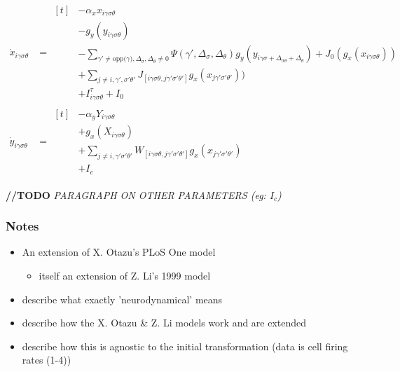 \documentclass[journal,onecolumn]{IEEEtran}
\begin{document}
\begin{align}
    \dot{x}_{i\gamma\sigma\theta} &= \begin{aligned}[t]
        & - \alpha_{x}x_{i\gamma\sigma\theta} \\
        & - g_y(y_{i\gamma\sigma\theta}) \\
        & - \sum\nolimits_{\gamma' \neq \text{opp($\gamma$)},\Delta_{\sigma},\Delta_{\theta} \neq 0}
            \Psi(\gamma',\Delta_{\sigma},\Delta_{\theta})
            g_y(y_{i\gamma\sigma + \Delta_{\sigma\theta} + \Delta_{\theta}})
            + J_0(g_x(x_{i\gamma\sigma\theta})) \\
        & + \sum\nolimits_{j \neq i,\gamma',\sigma'\theta'}
            J_{[i\gamma\sigma\theta, j\gamma'\sigma'\theta']}g_x(x_{j\gamma'\sigma'\theta'})) \\
        & + I^\tau_{i\gamma\sigma\theta} + I_0
        \end{aligned} \\
    \dot{y}_{i\gamma\sigma\theta} &= \begin{aligned}[t]
        & - \alpha_{y}Y_{i\gamma\sigma\theta} \\
        & + g_x(X_{i\gamma\sigma\theta}) \\
        & + \sum\nolimits_{j \neq i, \gamma'\sigma'\theta'}
            W_{[i\gamma\sigma\theta, j\gamma'\sigma'\theta']}g_x(x_{j\gamma'\sigma'\theta'}) \\
        & + I_{c}
       \end{aligned}
\end{align}

\textbf{//TODO} \textit{PARAGRAPH ON OTHER PARAMETERS (eg: $I_{c}$)}

\subsubsection{Notes}
\begin{itemize}
    \item An extension of X. Otazu's PLoS One model
    \begin{itemize}
        \item itself an extension of Z. Li's 1999 model
    \end{itemize}
    \item describe what exactly 'neurodynamical' means
    \item describe how the X. Otazu \& Z. Li models work and are extended
    \item describe how this is agnostic to the initial transformation (data is cell firing rates (1-4))
\end{itemize}
\end{document}
